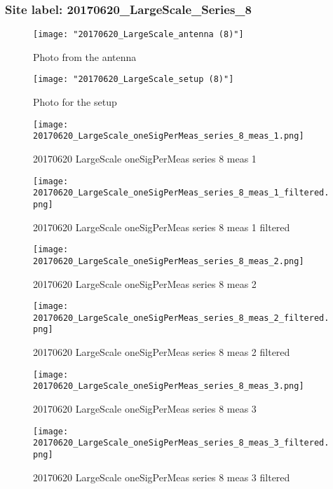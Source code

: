 \subsubsection{Site label: 20170620\_LargeScale\_Series\_8}
\begin{figure}[ht] \caption{Photo from the antenna}
\texttt{[image: "20170620\_LargeScale\_antenna (8)"]}\centering\end{figure}
\begin{figure}[ht] \caption{Photo for the setup}
\texttt{[image: "20170620\_LargeScale\_setup (8)"]}\centering\end{figure}
\begin{figure}[ht] \caption{20170620 LargeScale oneSigPerMeas series 8 meas 1}
\texttt{[image: 20170620\_LargeScale\_oneSigPerMeas\_series\_8\_meas\_1.png]}\centering\end{figure}
\begin{figure}[ht] \caption{20170620 LargeScale oneSigPerMeas series 8 meas 1 filtered}
\texttt{[image: 20170620\_LargeScale\_oneSigPerMeas\_series\_8\_meas\_1\_filtered.png]}\centering\end{figure}
\begin{figure}[ht] \caption{20170620 LargeScale oneSigPerMeas series 8 meas 2}
\texttt{[image: 20170620\_LargeScale\_oneSigPerMeas\_series\_8\_meas\_2.png]}\centering\end{figure}
\begin{figure}[ht] \caption{20170620 LargeScale oneSigPerMeas series 8 meas 2 filtered}
\texttt{[image: 20170620\_LargeScale\_oneSigPerMeas\_series\_8\_meas\_2\_filtered.png]}\centering\end{figure}
\begin{figure}[ht] \caption{20170620 LargeScale oneSigPerMeas series 8 meas 3}
\texttt{[image: 20170620\_LargeScale\_oneSigPerMeas\_series\_8\_meas\_3.png]}\centering\end{figure}
\begin{figure}[ht] \caption{20170620 LargeScale oneSigPerMeas series 8 meas 3 filtered}
\texttt{[image: 20170620\_LargeScale\_oneSigPerMeas\_series\_8\_meas\_3\_filtered.png]}\centering\end{figure}
\clearpage
